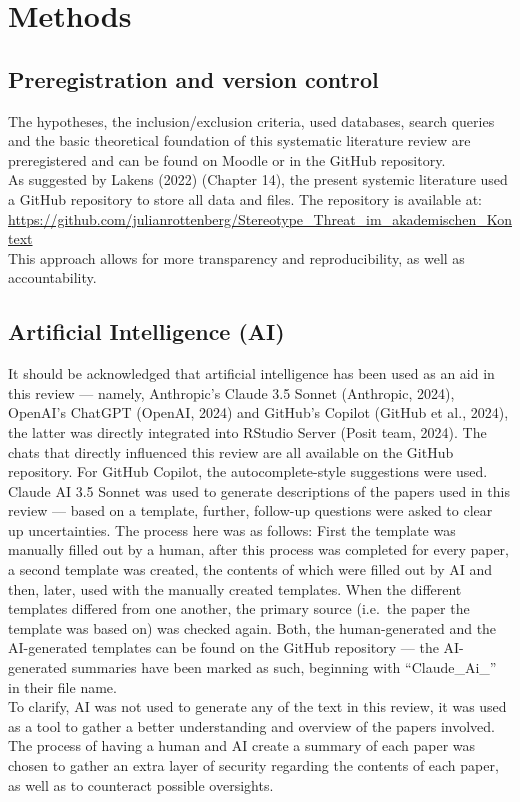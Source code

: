 \documentclass[
  stu, a4paper,floatsintext]{apa7}
\begin{document}
\section{Methods}\label{methods}

\subsection{Preregistration and version control}\label{preregistration-and-version-control}

The hypotheses, the inclusion/exclusion criteria, used databases, search queries and the basic theoretical foundation of this systematic literature review are preregistered and can be found on Moodle or in the GitHub repository.\\
As suggested by Lakens (2022) (Chapter 14), the present systemic literature used a GitHub repository to store all data and files. The repository is available at: \url{https://github.com/julianrottenberg/Stereotype_Threat_im_akademischen_Kontext}\\
This approach allows for more transparency and reproducibility, as well as accountability.

\subsection{Artificial Intelligence (AI)}\label{artificial-intelligence-ai}

It should be acknowledged that artificial intelligence has been used as an aid in this review --- namely, Anthropic's Claude 3.5 Sonnet (Anthropic, 2024), OpenAI's ChatGPT (OpenAI, 2024) and GitHub's Copilot (GitHub et al., 2024), the latter was directly integrated into RStudio Server (Posit team, 2024). The chats that directly influenced this review are all available on the GitHub repository.
For GitHub Copilot, the autocomplete-style suggestions were used.\\
Claude AI 3.5 Sonnet was used to generate descriptions of the papers used in this review --- based on a template, further, follow-up questions were asked to clear up uncertainties.
The process here was as follows: First the template was manually filled out by a human, after this process was completed for every paper, a second template was created, the contents of which were filled out by AI and then, later, used with the manually created templates. When the different templates differed from one another, the primary source (i.e.~the paper the template was based on) was checked again. Both, the human-generated and the AI-generated templates can be found on the GitHub repository --- the AI-generated summaries have been marked as such, beginning with ``Claude\_Ai\_'' in their file name.\\
To clarify, AI was not used to generate any of the text in this review, it was used as a tool to gather a better understanding and overview of the papers involved. The process of having a human and AI create a summary of each paper was chosen to gather an extra layer of security regarding the contents of each paper, as well as to counteract possible oversights.
\end{document}
